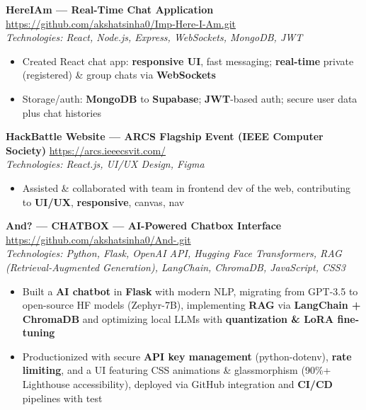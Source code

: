 \documentclass[10pt]{article}
\begin{document}
\textbf{HereIAm — Real-Time Chat Application} \hfill \href{https://github.com/akshatsinha0/Imp-Here-I-Am.git}{https://github.com/akshatsinha0/Imp-Here-I-Am.git}\\
{\small\textcolor{black!70}{\textit{Technologies: React, Node.js, Express, WebSockets, MongoDB, JWT}}}\\[-5pt]
\begin{itemize}
  \item Created React chat app: \textbf{responsive UI}, fast messaging; \textbf{real-time} private (registered) \& group chats via \textbf{WebSockets}
  \item Storage/auth: \textbf{MongoDB} to \textbf{Supabase}; \textbf{JWT}-based auth; secure user data plus chat histories
\end{itemize}

\textbf{HackBattle Website — ARCS Flagship Event (IEEE Computer Society)} \hfill \href{https://arcs.ieeecsvit.com/}{https://arcs.ieeecsvit.com/}\\
{\small\textcolor{black!70}{\textit{Technologies: React.js, UI/UX Design, Figma}}}\\[-5pt]
\begin{itemize}
  \item Assisted \& collaborated with team in frontend dev of the web, contributing to \textbf{UI/UX}, \textbf{responsive}, canvas, nav
\end{itemize}

\textbf{And? — CHATBOX — AI-Powered Chatbox Interface} \hfill \href{https://github.com/akshatsinha0/And-.git}{https://github.com/akshatsinha0/And-.git}\\
{\small\textcolor{black!70}{\textit{Technologies: Python, Flask, OpenAI API, Hugging Face Transformers, RAG (Retrieval-Augmented Generation), LangChain, ChromaDB, JavaScript, CSS3}}}\\[-5pt]
\begin{itemize}
  \item Built a \textbf{AI chatbot} in \textbf{Flask} with modern NLP, migrating from GPT-3.5 to open-source HF models (Zephyr-7B), implementing \textbf{RAG} via \textbf{LangChain + ChromaDB} and optimizing local LLMs with \textbf{quantization \& LoRA fine-tuning}
  \item Productionized with secure \textbf{API key management} (python-dotenv), \textbf{rate limiting}, and a UI featuring CSS animations \& glassmorphism (90\%+ Lighthouse accessibility), deployed via GitHub integration and \textbf{CI/CD} pipelines with test
\end{itemize}
\end{document}
